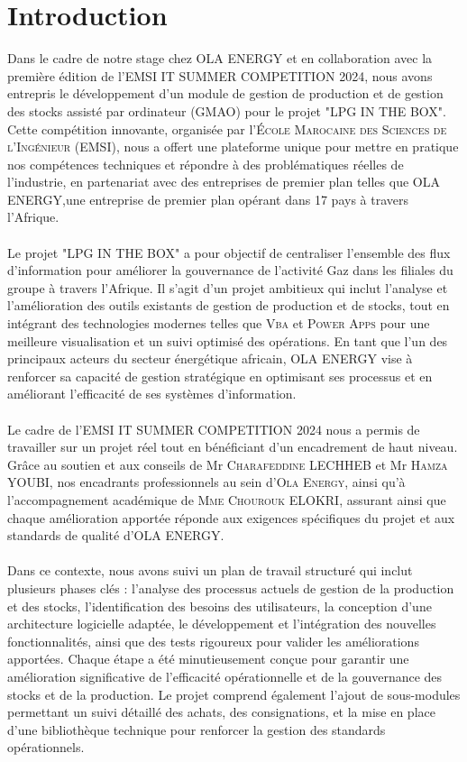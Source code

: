 \documentclass[a4paper, oneside, 12pt, final]{extreport}
\begin{document}
\chapter*{Introduction}
Dans le cadre de notre stage chez \textsc{OLA ENERGY} et en collaboration avec la première édition de l'\textsc{EMSI IT SUMMER COMPETITION 2024}, nous avons entrepris le développement d'un module de gestion de production et de gestion des stocks assisté par ordinateur (GMAO) pour le projet "\textsc{LPG IN THE BOX}". Cette compétition innovante, organisée par l'\textsc{École Marocaine des Sciences de l'Ingénieur} (\textsc{EMSI}), nous a offert une plateforme unique pour mettre en pratique nos compétences techniques et répondre à des problématiques réelles de l'industrie, en partenariat avec des entreprises de premier plan telles que \textsc{OLA ENERGY},une entreprise de premier plan opérant dans 17 pays à travers l'Afrique.
\\
\\
Le projet "\textsc{LPG IN THE BOX}" a pour objectif de centraliser l’ensemble des flux d’information pour améliorer la gouvernance de l’activité Gaz dans les filiales du groupe à travers l'Afrique. Il s’agit d’un projet ambitieux qui inclut l’analyse et l'amélioration des outils existants de gestion de production et de stocks, tout en intégrant des technologies modernes telles que \textsc{Vba} et \textsc{Power Apps} pour une meilleure visualisation et un suivi optimisé des opérations. En tant que l'un des principaux acteurs du secteur énergétique africain, \textsc{OLA ENERGY} vise à renforcer sa capacité de gestion stratégique en optimisant ses processus et en améliorant l'efficacité de ses systèmes d’information.
\\
\\
Le cadre de l'\textsc{EMSI IT SUMMER COMPETITION 2024} nous a permis de travailler sur un projet réel tout en bénéficiant d’un encadrement de haut niveau. Grâce au soutien et aux conseils de Mr \textsc{Charafeddine LECHHEB} et Mr \textsc{Hamza YOUBI}, nos encadrants professionnels au sein d'\textsc{Ola Energy}, ainsi qu'à l'accompagnement académique de \textsc{Mme Chourouk ELOKRI}, assurant ainsi que chaque amélioration apportée réponde aux exigences spécifiques du projet et aux standards de qualité d'\textsc{OLA ENERGY}.
\\
\\
Dans ce contexte, nous avons suivi un plan de travail structuré qui inclut plusieurs phases clés : l'analyse des processus actuels de gestion de la production et des stocks, l'identification des besoins des utilisateurs, la conception d'une architecture logicielle adaptée, le développement et l'intégration des nouvelles fonctionnalités, ainsi que des tests rigoureux pour valider les améliorations apportées. Chaque étape a été minutieusement conçue pour garantir une amélioration significative de l'efficacité opérationnelle et de la gouvernance des stocks et de la production. Le projet comprend également l'ajout de sous-modules permettant un suivi détaillé des achats, des consignations, et la mise en place d'une bibliothèque technique pour renforcer la gestion des standards opérationnels.
\end{document}
